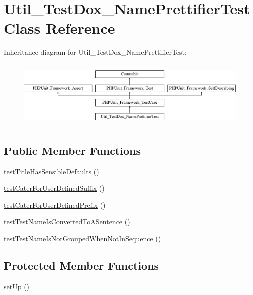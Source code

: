 \hypertarget{class_util___test_dox___name_prettifier_test}{}\section{Util\+\_\+\+Test\+Dox\+\_\+\+Name\+Prettifier\+Test Class Reference}
\label{class_util___test_dox___name_prettifier_test}
Inheritance diagram for Util\+\_\+\+Test\+Dox\+\_\+\+Name\+Prettifier\+Test\+:\begin{figure}[H]
\begin{center}
\leavevmode
\includegraphics[height=3.303835cm]{class_util___test_dox___name_prettifier_test}
\end{center}
\end{figure}
\subsection*{Public Member Functions}
\begin{DoxyCompactItemize}
\item 
\mbox{\hyperlink{class_util___test_dox___name_prettifier_test_a0f855d3e7644ac3a3df731c0f9d487f4}{test\+Title\+Has\+Sensible\+Defaults}} ()
\item 
\mbox{\hyperlink{class_util___test_dox___name_prettifier_test_a1dc37dbfc373f692a805e11d4c1b441c}{test\+Cater\+For\+User\+Defined\+Suffix}} ()
\item 
\mbox{\hyperlink{class_util___test_dox___name_prettifier_test_a3ad4ddb0cc5a67d2c4844c56acc513ff}{test\+Cater\+For\+User\+Defined\+Prefix}} ()
\item 
\mbox{\hyperlink{class_util___test_dox___name_prettifier_test_a181500565173029d698855d0c3a85140}{test\+Test\+Name\+Is\+Converted\+To\+A\+Sentence}} ()
\item 
\mbox{\hyperlink{class_util___test_dox___name_prettifier_test_afc91504e69c1b3547e20713569e70443}{test\+Test\+Name\+Is\+Not\+Grouped\+When\+Not\+In\+Sequence}} ()
\end{DoxyCompactItemize}
\subsection*{Protected Member Functions}
\begin{DoxyCompactItemize}
\item 
\mbox{\hyperlink{class_util___test_dox___name_prettifier_test_a0bc688732d2b3b162ffebaf7812e78da}{set\+Up}} ()
\end{DoxyCompactItemize}
